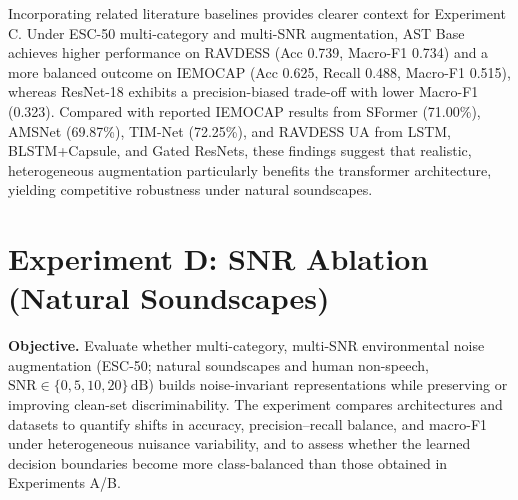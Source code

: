 Incorporating related literature baselines provides clearer context for Experiment C. Under ESC-50 multi-category and multi-SNR augmentation, AST Base achieves higher performance on RAVDESS (Acc 0.739, Macro-F1 0.734) and a more balanced outcome on IEMOCAP (Acc 0.625, Recall 0.488, Macro-F1 0.515), whereas ResNet-18 exhibits a precision-biased trade-off with lower Macro-F1 (0.323). Compared with reported IEMOCAP results from SFormer (71.00\%), AMSNet (69.87\%), TIM-Net (72.25\%), and RAVDESS UA from LSTM, BLSTM+Capsule, and Gated ResNets, these findings suggest that realistic, heterogeneous augmentation particularly benefits the transformer architecture, yielding competitive robustness under natural soundscapes.

\begin{table}[htbp]
    \centering
    \caption{ Results of Experiment C on two datasets }
    \label{tab:esc_noise_results}
    \setlength{\tabcolsep}{5pt}
\end{table}

\section{Experiment D: SNR Ablation (Natural Soundscapes)}
\textbf{Objective.} Evaluate whether multi-category, multi-SNR environmental noise augmentation (ESC-50; natural soundscapes and human non-speech, \(\mathrm{SNR}\in\{0,5,10,20\}\,\mathrm{dB}\)) builds noise-invariant representations while preserving or improving clean-set discriminability. The experiment compares architectures and datasets to quantify shifts in accuracy, precision–recall balance, and macro-F1 under heterogeneous nuisance variability, and to assess whether the learned decision boundaries become more class-balanced than those obtained in Experiments A/B.

